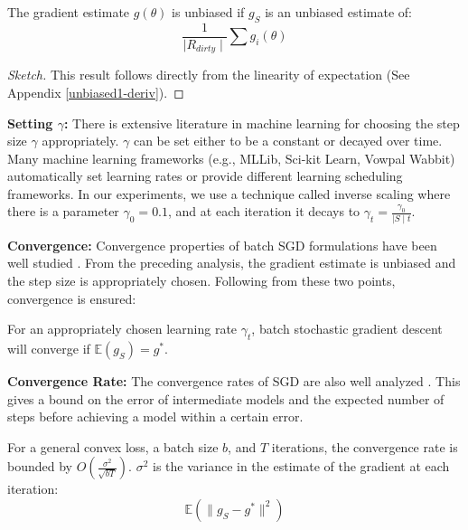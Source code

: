\begin{lemma}\label{unbiased1}
The gradient estimate $g(\theta)$ is unbiased if $g_S$ is an unbiased estimate of:
\[
\frac{1}{\mid R_{dirty} \mid} \sum g_i(\theta)
\]
\end{lemma}
\begin{proof}[Sketch]
This result follows directly from the linearity of expectation (See Appendix \ref{unbiased1-deriv}).
\end{proof}

\vspace{0.25em}

\noindent\textbf{ Setting $\gamma$: } There is extensive literature in machine learning for choosing the step size $\gamma$ appropriately. $\gamma$ can be set either to be a constant or decayed over time. Many machine learning frameworks (e.g., MLLib, Sci-kit Learn, Vowpal Wabbit) automatically set learning rates or provide different learning scheduling frameworks. 
In our experiments, we use a technique called inverse scaling where there is a parameter $\gamma_0=0.1$, and at each iteration it decays to $\gamma_t = \frac{\gamma_0}{\mid S \mid t}$. 

\vspace{0.25em}

\noindent\textbf{ Convergence: } Convergence properties of batch SGD formulations have been well studied \cite{dekel2012optimal}. From the preceding analysis, the gradient estimate is unbiased and the step size is appropriately chosen. Following from these two points, convergence is ensured: 

\begin{proposition}
For an appropriately chosen learning rate $\gamma_t$, batch stochastic gradient descent will converge if $\mathbb{E}(g_S)=g^*$.
\label{unbiased}
\end{proposition}

\vspace{0.25em}

\noindent\textbf{ Convergence Rate: } The convergence rates of SGD are also well analyzed \cite{dekel2012optimal,bertsekas2011incremental,zhao2014stochastic}. 
This gives a bound on the error of intermediate models and the expected number of steps before achieving a model within a certain error. 

\begin{proposition}
For a general convex loss, a batch size $b$, and $T$ iterations, the convergence rate is bounded by $O(\frac{\sigma^2}{\sqrt{bT}})$. 
$\sigma^2$ is the variance in the estimate of the gradient at each iteration:
\[
\mathbb{E}(\|g_S - g^*\|^2)
\]
\end{proposition}

